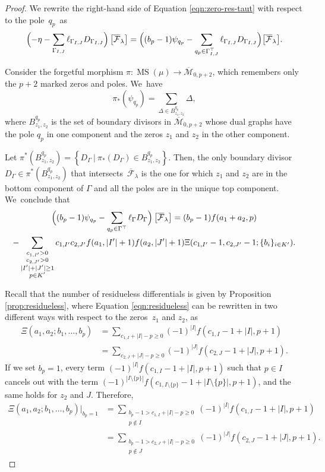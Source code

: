 \documentclass[JEP,XML,SOM,Unicode,NoFloatCountersInSection,published]{cedram}
\DeclareMathOperator\MS{MS}
\theoremstyle{definition}
\begin{document}
\begin{proof}
We rewrite the right-hand side of Equation \eqref{eqn:zero-res-taut} with respect to the pole~$q_p$~as
\begin{equation*}
\Bigl(-\eta-\sum_{\Gamma_{I,J}}\ell_{\Gamma_{I,J}} D_{\Gamma_{I,J}}\Bigr)\left[\overline{\mathcal{F}}_{\lambda}\right]=\Bigl((b_p-1)\psi_{q_p}-\sum_{q_p\in \Gamma_{I,J}^{\top}}\ell_{\Gamma_{I,J}}D_{\Gamma_{I,J}}\Bigr)\bigl[\overline{\mathcal{F}}_{\lambda}\bigr].
\end{equation*}

Consider the forgetful morphism $\pi\colon \MS(\mu)\to \overline{\mathcal M}_{0,p+2}$, which remembers only the $p+2$ marked zeros and poles. We~have
\[
\pi_{*}(\psi_{q_p})=\sum_{\Delta \in B^{q_p}_{z_1,z_2}}\Delta,
\]
where $B^{q_p}_{z_1,z_2}$ is the set of boundary divisors in $\overline{\mathcal M}_{0,p+2}$ whose dual graphs have the pole $q_p$ in one component and the zeros $z_1$ and $z_2$ in the other component.

Let $\pi^*(B^{q_p}_{z_1,z_2}) =\left\{D_{\Gamma}\ | \ \pi_{*}(D_{\Gamma})\in B^{q_p}_{z_1,z_2}\right\}$. Then, the only boundary divisor $D_{\Gamma}\in \pi^*(B^{q_p}_{z_1,z_2})$ that intersects~$\overline{\mathcal{F}}_{\lambda}$ is the one for which $z_1$ and $z_2$ are in the bottom component of $\Gamma$ and all the poles are in the unique top component. We~conclude that\vspace*{-5pt}
\begin{multline}
\Bigl((b_p-1)\psi_{q_p}-\sum_{q_p\in \Gamma^{\top}}\ell_{\Gamma}D_{\Gamma}\Bigr)\left[\overline{\mathcal{F}}_{\lambda}\right]
=(b_p-1)f(a_1+a_2,p) \\
-\sum_{\substack{c_{1,I'}>0 \\ c_{2,J'}>0 \\ |I'|+|J'|\geq 1 \\ p\in K'}}c_{1,I'}c_{2,J'}f(a_1,|I'|+1)f(a_2,|J'|+1)\Xi(c_{1,I'}-1,c_{2,J'}-1;\{b_i\}_{i\in K'}).
\end{multline}

Recall that the number of residueless differentials is given by Proposition \ref{prop:residueless}, where Equation \eqref{eqn:residueless} can be rewritten in two different ways with respect to the zeros~$z_1$ and $z_2$, as
\begin{align*}
\Xi(a_1,a_2;b_1,\ldots,b_p) & = \sum_{c_{1,I}+|I|-p\geq 0}(-1)^{|I|}f(c_{1,I}-1+|I|,p+1)\\
& = \sum_{c_{2,J}+|J|-p\geq 0}(-1)^{|J|}f(c_{2,J}-1+|J|,p+1).
\end{align*}
If we set $b_p=1$, every term $(-1)^{|I|}f(c_{1,I}-1+|I|,p+1)$ such that $p\in I$ cancels out with the term $(-1)^{|I\setminus\{p\}|}f(c_{1,I\setminus\{p\}}-1+|I\setminus\{p\}|,p+1)$, and the same holds for $z_2$ and $J$. Therefore,
\begin{align*}
\Xi(a_1,a_2;b_1,\ldots,b_p)|_{b_p=1} & = \sum_{\substack{b_p-1>c_{1,I}+|I|-p\geq 0\\ p\notin I}}(-1)^{|I|}f(c_{1,I}-1+|I|,p+1)\\
& = \sum_{\substack{b_p-1>c_{2,J}+|I|-p\geq 0\\ p\notin J}}(-1)^{|J|}f(c_{2,J}-1+|J|,p+1).
\end{align*}


\end{proof}
\end{document}

